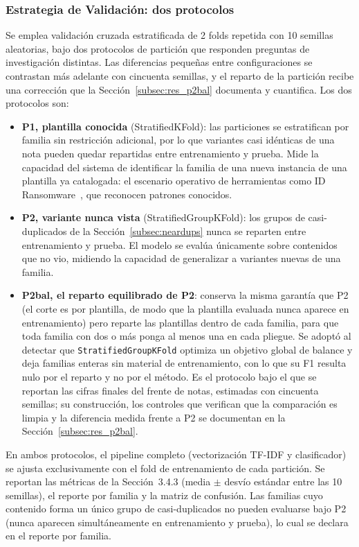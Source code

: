 \subsubsection{Estrategia de Validación: dos protocolos}
\label{subsec:protocolos_nlp}

Se emplea validación cruzada estratificada de 2 folds repetida con 10 semillas aleatorias, bajo dos protocolos de partición que responden preguntas de investigación distintas. Las diferencias pequeñas entre configuraciones se contrastan más adelante con cincuenta semillas, y el reparto de la partición recibe una corrección que la Sección~\ref{subsec:res_p2bal} documenta y cuantifica. Los dos protocolos son:

\begin{itemize}
\item \textbf{P1, plantilla conocida} (StratifiedKFold): las particiones se estratifican por familia sin restricción adicional, por lo que variantes casi idénticas de una nota pueden quedar repartidas entre entrenamiento y prueba. Mide la capacidad del sistema de identificar la familia de una nueva instancia de una plantilla ya catalogada: el escenario operativo de herramientas como ID Ransomware~\cite{idransomware}, que reconocen patrones conocidos.
\item \textbf{P2, variante nunca vista} (StratifiedGroupKFold): los grupos de casi-duplicados de la Sección~\ref{subsec:neardups} nunca se reparten entre entrenamiento y prueba. El modelo se evalúa únicamente sobre contenidos que no vio, midiendo la capacidad de generalizar a variantes nuevas de una familia.
\item \textbf{P2bal, el reparto equilibrado de P2}: conserva la misma garantía que P2 (el corte es por plantilla, de modo que la plantilla evaluada nunca aparece en entrenamiento) pero reparte las plantillas dentro de cada familia, para que toda familia con dos o más ponga al menos una en cada pliegue. Se adoptó al detectar que \texttt{StratifiedGroupKFold} optimiza un objetivo global de balance y deja familias enteras sin material de entrenamiento, con lo que su F1 resulta nulo por el reparto y no por el método. Es el protocolo bajo el que se reportan las cifras finales del frente de notas, estimadas con cincuenta semillas; su construcción, los controles que verifican que la comparación es limpia y la diferencia medida frente a P2 se documentan en la Sección~\ref{subsec:res_p2bal}.
\end{itemize}

En ambos protocolos, el pipeline completo (vectorización TF-IDF y clasificador) se ajusta exclusivamente con el fold de entrenamiento de cada partición. Se reportan las métricas de la Sección~3.4.3 (media $\pm$ desvío estándar entre las 10 semillas), el reporte por familia y la matriz de confusión. Las familias cuyo contenido forma un único grupo de casi-duplicados no pueden evaluarse bajo P2 (nunca aparecen simultáneamente en entrenamiento y prueba), lo cual se declara en el reporte por familia.

